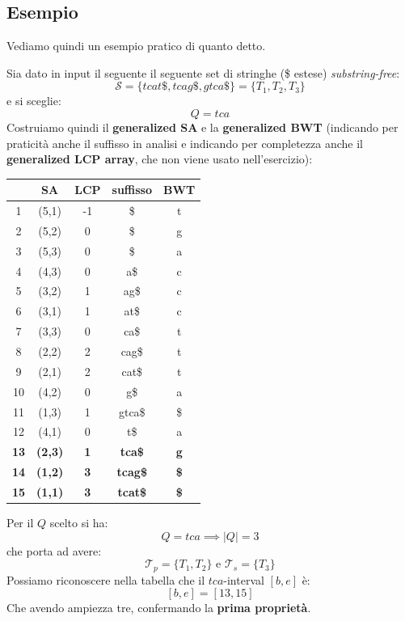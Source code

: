\documentclass[a4paper,12pt, oneside]{book}
\begin{document}
\subsection{Esempio}
Vediamo quindi un esempio pratico di quanto detto.
\begin{esempio}
  Sia dato in input il seguente il seguente set di stringhe (\$ estese)
  \textit{substring-free}: 
  \[\mathcal{S}=\{tcat\$, tcag\$, gtca\$\}=\{T_1, T_2, T_3\}\]
  e si sceglie:
  \[Q=tca\]
  Costruiamo quindi il \textbf{generalized SA} e la \textbf{generalized BWT}
  (indicando per  praticità anche il suffisso in analisi e indicando per
  completezza anche il \textbf{generalized LCP array}, che non viene usato
  nell'esercizio): 
  \begin{table}[H]
    \centering
    \begin{tabular}{c|c|c|c|c|}
      & \textbf{SA} & \textbf{LCP} & \textbf{suffisso} & \textbf{BWT}\\
      \hline
      1 & (5,1) & -1 & \$ & t \\
      2 & (5,2) & 0 & \$ & g \\ 
      3 & (5,3) & 0 & \$ & a \\ 
      4 & (4,3) & 0 & a\$ & c \\ 
      5 & (3,2) & 1 & ag\$ & c \\ 
      6 & (3,1) & 1 & at\$ & c \\
      7 & (3,3) & 0 & ca\$ & t \\
      8 & (2,2) & 2 & cag\$ & t \\
      9 & (2,1) & 2 & cat\$ & t \\
      10 & (4,2) & 0 & g\$ & a \\
      11 & (1,3) & 1 & gtca\$ & \$ \\ 
      12 & (4,1) & 0 & t\$ & a \\ 
      \textbf{13} & \textbf{(2,3)} & \textbf{1} & \textbf{tca\$} & \textbf{g} \\ 
      \textbf{14} & \textbf{(1,2)} & \textbf{3} &\textbf{tcag\$} & \textbf{\$}\\ 
      \textbf{15} & \textbf{(1,1)} & \textbf{3} & \textbf{tcat\$} & \textbf{\$} 
    \end{tabular}
  \end{table}
  Per il $Q$ scelto si ha:
  \[Q=tca\implies |Q|=3\]
  che porta ad avere:
  \[\mathcal{T}_p=\{T_1, T_2\}\mbox{ e }\mathcal{T}_s=\{T_3\}\]
  Possiamo riconoscere nella tabella che il $tca$-interval $[b,e]$ è:
  \[[b,e]=[13,15]\]
  Che avendo ampiezza tre, confermando la \textbf{prima proprietà}.\\

\end{esempio}
\end{document}
